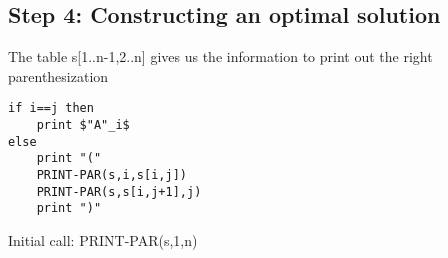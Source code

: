 \documentclass{article}[18pt]
\begin{document}
\subsection{Step 4: Constructing an optimal solution}
The table s[1..n-1,2..n] gives us the information to print out the right parenthesization
\begin{lstlisting}[caption=PRINT-PAR({s,i,j})]
if i==j then
	print $"A"_i$
else
	print "("
	PRINT-PAR(s,i,s[i,j])
	PRINT-PAR(s,s[i,j+1],j)
	print ")"
\end{lstlisting}
Initial call: PRINT-PAR(s,1,n)
\end{document}
